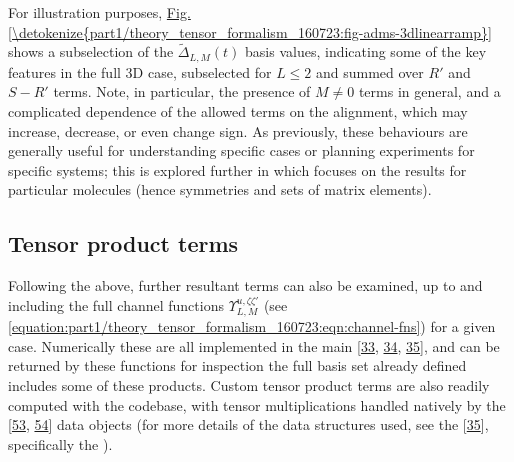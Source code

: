 \documentclass[letterpaper,table,10pt,english]{jupyterBook}
\begin{document}
\sphinxAtStartPar
For illustration purposes, \hyperref[\detokenize{part1/theory_tensor_formalism_160723:fig-adms-3dlinearramp}]{Fig.\@ \ref{\detokenize{part1/theory_tensor_formalism_160723:fig-adms-3dlinearramp}}} shows a subselection of the \(\tilde{\Delta}_{L,M}(t)\) basis values, indicating some of the key features in the full 3D case, subselected for \(L\leq2\) and summed over \(R'\) and \(S-R'\) terms. Note, in particular, the presence of \(M\neq0\) terms in general, and a complicated dependence of the allowed terms on the alignment, which may increase, decrease, or even change sign. As previously, these behaviours are generally useful for understanding specific cases or planning experiments for specific systems; this is explored further in {\hyperref[\detokenize{part2/extracting_matrix_elements_overview_270423:chpt-extracting-matrix-elements-overview}]{}} which focuses on the results for particular molecules (hence symmetries and sets of matrix elements).


\subsection{Tensor product terms}
\label{\detokenize{part1/theory_tensor_formalism_160723:tensor-product-terms}}\label{\detokenize{part1/theory_tensor_formalism_160723:sec-theory-tensor-products}}
\sphinxAtStartPar
Following the above, further resultant terms can also be examined, up to and including the full channel functions \(\varUpsilon_{L,M}^{u,\zeta\zeta'}\) (see \eqref{equation:part1/theory_tensor_formalism_160723:eqn:channel-fns}) for a given case. Numerically these are all implemented in the main  {[}\hyperlink{cite.backmatter/bibliography:id664}{33}, \hyperlink{cite.backmatter/bibliography:id606}{34}, \hyperlink{cite.backmatter/bibliography:id604}{35}{]}, and can be returned by these functions for inspection \sphinxhyphen{} the full basis set already defined includes some of these products. Custom tensor product terms are also readily computed with the codebase, with tensor multiplications handled natively by the  {[}\hyperlink{cite.backmatter/bibliography:id696}{53}, \hyperlink{cite.backmatter/bibliography:id971}{54}{]} data objects (for more details of the data structures used, see the  {[}\hyperlink{cite.backmatter/bibliography:id604}{35}{]}, specifically the ).
\end{document}

